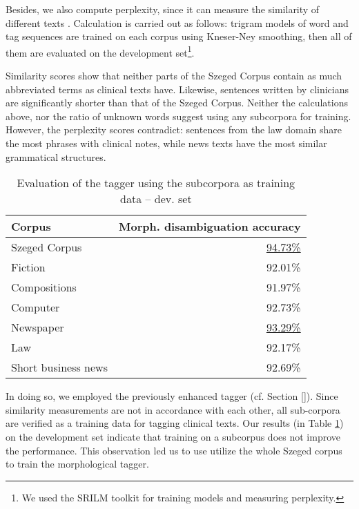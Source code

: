 Besides, we also compute perplexity, since it can measure the similarity of different texts \cite{kilgarriff1998measures}. 
Calculation is carried out as follows: trigram models of word and tag sequences are trained on each corpus using Kneser-Ney smoothing, then all of them are evaluated on the development set\footnote{We used the SRILM toolkit \cite{stolcke2002srilm} for training models and measuring perplexity.}.

Similarity scores show that neither parts of the Szeged Corpus contain as much abbreviated terms as clinical texts have. 
Likewise, sentences written by clinicians are significantly shorter than that of the Szeged Corpus. 
Neither the calculations above, nor the ratio of unknown words suggest using any subcorpora for training. 
However, the perplexity scores contradict: sentences from the law domain share the most phrases with clinical notes, while news texts have the most similar grammatical structures. 

\begin{table}[h]
\centering
\caption{Evaluation of the tagger using the subcorpora as training data -- dev. set}
\label{tab:eval_subcorpora}
\begin{tabular}{ l r } 
\hline
Corpus & Morph. disambiguation accuracy \\
\hline
Szeged Corpus & \underline{94.73\%} \\
\hspace{0.2cm} Fiction & 92.01\% \\
\hspace{0.2cm} Compositions & 91.97\% \\
\hspace{0.2cm} Computer & 92.73\% \\
\hspace{0.2cm} Newspaper & \underline{93.29\%} \\
\hspace{0.2cm} Law & 92.17\% \\
\hspace{0.2cm} Short business news & 92.69\% \\
\hline
\end{tabular}
\end{table}

In doing so, we employed the previously enhanced tagger (cf. Section \ref{}). 
Since similarity measurements are not in accordance with each other, all sub-corpora are verified as a training data for tagging clinical texts. 
Our results (in Table  \ref{tab:eval_subcorpora}) on the development set indicate that training on a  subcorpus does not improve the performance. %
This observation led us to use utilize the whole Szeged corpus to train the morphological tagger.


